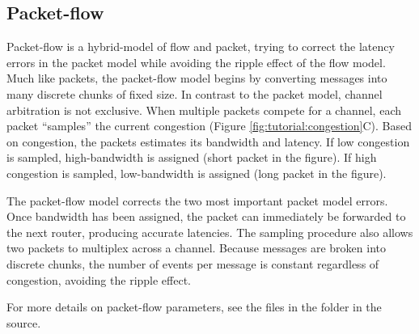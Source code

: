 \subsection{Packet-flow}
\label{subsec:tutorial:train}
Packet-flow is a hybrid-model of flow and packet, trying to correct the latency errors in the packet model while avoiding the ripple effect of the flow model.
Much like packets, the packet-flow model begins by converting messages into many discrete chunks of fixed size.
In contrast to the packet model, channel arbitration is not exclusive.  
When multiple packets compete for a channel, each packet ``samples'' the current congestion (Figure \ref{fig:tutorial:congestion}C).
Based on congestion, the packets estimates its bandwidth and latency.
If low congestion is sampled, high-bandwidth is assigned (short packet in the figure).
If high congestion is sampled, low-bandwidth is assigned (long packet in the figure).

The packet-flow model corrects the two most important packet model errors.
Once bandwidth has been assigned, the packet can immediately be forwarded to the next router, producing accurate latencies.
The sampling procedure also allows two packets to multiplex across a channel.
Because messages are broken into discrete chunks, the number of events per message is constant regardless of congestion, avoiding the ripple effect.

For more details on packet-flow parameters, see the  files in the  folder in the \sstmacro source.


